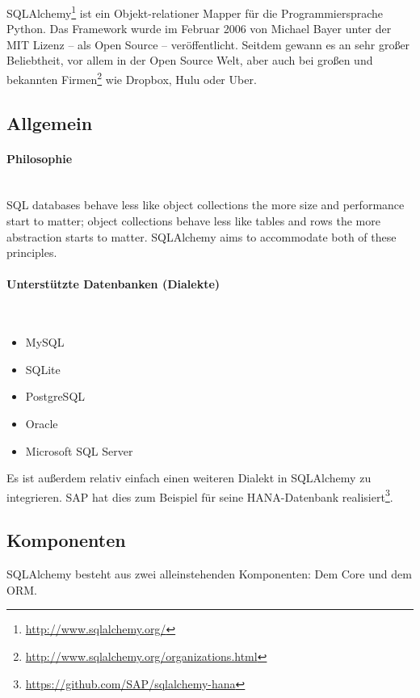 SQLAlchemy\footnote{\href{http://www.sqlalchemy.org/}{http://www.sqlalchemy.org/}} ist ein Objekt-relationer Mapper für die Programmiersprache Python. Das Framework wurde im Februar 2006 von Michael Bayer unter der MIT Lizenz – als Open Source – veröffentlicht. Seitdem gewann es an sehr großer Beliebtheit, vor allem in der Open Source Welt, aber auch bei großen und bekannten Firmen\footnote{\href{http://www.sqlalchemy.org/organizations.html}{http://www.sqlalchemy.org/organizations.html}} wie Dropbox, Hulu oder Uber.

\subsection{Allgemein}

\paragraph{Philosophie} \hspace{0pt} \\
SQL databases behave less like object collections the more size and performance start to matter; object collections behave less like tables and rows the more abstraction starts to matter. SQLAlchemy aims to accommodate both of these principles.

\paragraph{Unterstützte Datenbanken (Dialekte)} \hspace{0pt} \\
\begin{itemize}
	\item MySQL
	\item SQLite
	\item PostgreSQL
	\item Oracle
	\item Microsoft SQL Server
\end{itemize}

Es ist außerdem relativ einfach einen weiteren Dialekt in SQLAlchemy zu integrieren. SAP hat dies zum Beispiel für seine HANA-Datenbank realisiert\footnote{\href{https://github.com/SAP/sqlalchemy-hana}{https://github.com/SAP/sqlalchemy-hana}}.

\subsection{Komponenten}
SQLAlchemy besteht aus zwei alleinstehenden Komponenten: Dem Core und dem ORM.

